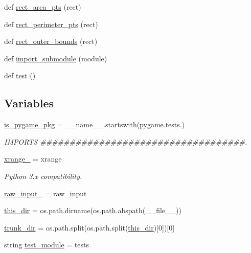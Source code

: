 \begin{DoxyCompactItemize}
def \hyperlink{namespacepygame_1_1tests_1_1test__utils_a79ca888153a6d17a90b37688319d5e3c}{rect\+\_\+area\+\_\+pts} (rect)
\item 
def \hyperlink{namespacepygame_1_1tests_1_1test__utils_a891def05e6d256b4680847590bab1f0f}{rect\+\_\+perimeter\+\_\+pts} (rect)
\item 
def \hyperlink{namespacepygame_1_1tests_1_1test__utils_a2499d7b9c280c106a4b86c6f4c28daf2}{rect\+\_\+outer\+\_\+bounds} (rect)
\item 
def \hyperlink{namespacepygame_1_1tests_1_1test__utils_a514fb747a30e17d1af7637103ec1109c}{import\+\_\+submodule} (module)
\item 
def \hyperlink{namespacepygame_1_1tests_1_1test__utils_afae36af2d28d87721ceebeff87a4b10c}{test} ()
\end{DoxyCompactItemize}
\subsection*{Variables}
\begin{DoxyCompactItemize}
\item 
\hyperlink{namespacepygame_1_1tests_1_1test__utils_a982779307b7984dcd610092576141c6a}{is\+\_\+pygame\+\_\+pkg} = \+\_\+\+\_\+name\+\_\+\+\_\+.\+startswith(\textquotesingle{}pygame.\+tests.\textquotesingle{})
\begin{DoxyCompactList}\small\item\em I\+M\+P\+O\+R\+TS \#\#\#\#\#\#\#\#\#\#\#\#\#\#\#\#\#\#\#\#\#\#\#\#\#\#\#\#\#\#\#\#\#\#\#. \end{DoxyCompactList}\item 
\hyperlink{namespacepygame_1_1tests_1_1test__utils_aaa0c3e4a00939105148404f38be4d9c2}{xrange\+\_\+} = xrange
\begin{DoxyCompactList}\small\item\em Python 3.\+x compatibility. \end{DoxyCompactList}\item 
\hyperlink{namespacepygame_1_1tests_1_1test__utils_a8be2c3bd0b5f527ac8dfdcb4fc252336}{raw\+\_\+input\+\_\+} = raw\+\_\+input
\item 
\hyperlink{namespacepygame_1_1tests_1_1test__utils_ac3206c735480edd473b1d363bffa80e2}{this\+\_\+dir} = os.\+path.\+dirname(os.\+path.\+abspath(\+\_\+\+\_\+file\+\_\+\+\_\+))
\item 
\hyperlink{namespacepygame_1_1tests_1_1test__utils_aeed701fe6c8c9f543631393225a4e7f4}{trunk\+\_\+dir} = os.\+path.\+split(os.\+path.\+split(\hyperlink{namespacepygame_1_1tests_1_1test__utils_ac3206c735480edd473b1d363bffa80e2}{this\+\_\+dir})\mbox{[}0\mbox{]})\mbox{[}0\mbox{]}
\item 
string \hyperlink{namespacepygame_1_1tests_1_1test__utils_a6c75f3dcd634ccfb07d03e5d0b9ba38e}{test\+\_\+module} = \textquotesingle{}tests\textquotesingle{}
\end{DoxyCompactItemize}


